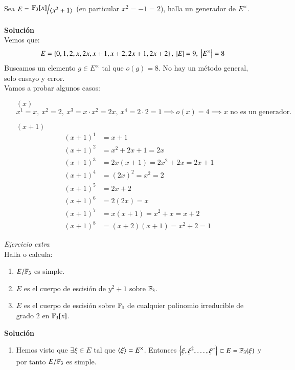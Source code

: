 \begin{ex}[H3.19]
    Sea $E = \quo{\F_3[x]}{\gen{x^2 + 1}}$ (en particular $x^2 = -1 = 2$), halla un generador de $E^\times$.\\\\

    \textbf{Solución}\\
    Vemos que:
    $$
        E = \left\{0, 1, 2, x, 2x, x+1, x+2, 2x+1, 2x+2\right\},\ \left|E\right| = 9,\ \left|E^\times\right|=8
    $$
    Buscamos un elemento $g \in E^\times$ tal que $o(g) = 8$. No hay un método general, solo ensayo y error.\\
    Vamos a probar algunos casos:
    \begin{itemize}
        \item[$(x)$]
        $$
            x^1 = x,\ x^2 = 2,\ x^3 = x\cdot x^2 = 2x,\ x^4 = 2 \cdot 2 = 1 \implies o(x) = 4 \implies x \text{ no es un generador.}
        $$
        \item[$(x+1)$]
        \begin{align*}
            (x+1)^1 &= x+1\\
            (x+1)^2 &= x^2 + 2x + 1 = 2x\\
            (x+1)^3 &= 2x(x+1) = 2x^2 + 2x = 2x + 1\\
            (x+1)^4 &= (2x)^2 = x^2 = 2\\
            (x+1)^5 &= 2x+2\\
            (x+1)^6 &= 2(2x) = x\\
            (x+1)^7 &= x(x+1) = x^2 + x = x + 2\\
            (x+1)^8 &= (x+2)(x+1) = x^2 + 2 = 1
        \end{align*}
    \end{itemize}
    \textit{Ejercicio extra}\\
    Halla o calcula:
    \begin{enumerate}
        \item $E/\mathbb{F}_3$ es simple.
        \item $E$ es el cuerpo de escisión de $y^2 + 1$ sobre $\mathbb{F}_3$.
        \item $E$ es el cuerpo de escisión sobre $\mathbb{F}_3$ de cualquier polinomio irreducible de grado $2$ en $\mathbb{F}_3[x]$.
    \end{enumerate}
    \textbf{Solución}\\ %
    \begin{enumerate}
        \item Hemos visto que $\exists \xi \in E$ tal que $\langle\xi\rangle = E^\times$. Entonces $\left\{\xi, \xi^2, \ldots, \xi^n\right\} \subset E = \mathbb{F}_3(\xi)$ y por tanto $E/\mathbb{F}_3$ es simple.
    \end{enumerate}
\end{ex}

